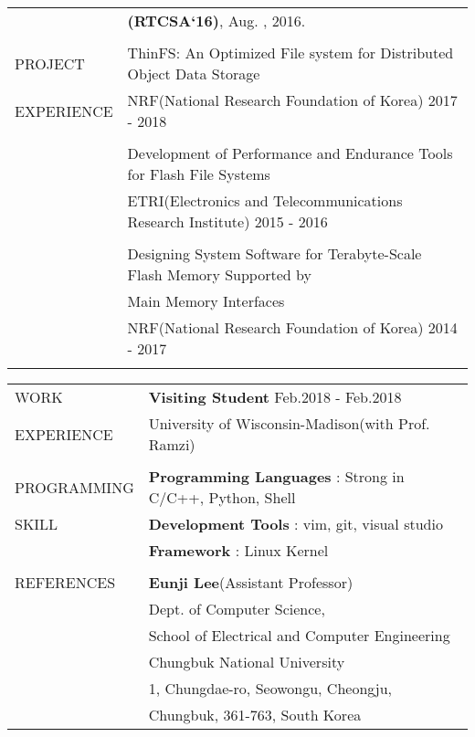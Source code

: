 \documentclass[letterpaper,11pt,oneside]{article}
\begin{document}
\begin{tabular}{@{} l l}
	&\textbf{(RTCSA`16)}, Aug. , 2016.\\
    & \\
  \Large{PROJECT}   & ThinFS: An Optimized File system for Distributed Object Data Storage \\
    \Large{EXPERIENCE}   & NRF(National Research Foundation of Korea) 2017 - 2018 \\
     & \\
     &Development of Performance and Endurance Tools for Flash File Systems\\
     &ETRI(Electronics and Telecommunications Research Institute) 2015 - 2016\\    
     &\\
     &Designing System Software for Terabyte-Scale Flash Memory Supported by \\
     &Main Memory Interfaces\\
     &NRF(National Research Foundation of Korea) 2014 - 2017\\
     & \\

\end{tabular}

\newpage


\noindent \begin{tabular}{@{} l l}
 \Large{WORK}    & \textbf{Visiting Student} \null\hfill Feb.2018 - Feb.2018\\
  \Large{EXPERIENCE}   & University of Wisconsin-Madison(with Prof. Ramzi) \\
     & \\

 \Large{PROGRAMMING}    & \textbf{Programming Languages} : Strong in C/C++, Python, Shell\\
  \Large{SKILL}   & \textbf{Development Tools} : vim, git, visual studio \\
  	& \textbf{Framework} : Linux Kernel\\
    & \\
 \Large{REFERENCES} & \textbf{Eunji Lee}(Assistant Professor)\\
	&Dept. of Computer Science,\\
	&School of Electrical and Computer Engineering\\
	&Chungbuk National University\\
	&1, Chungdae-ro, Seowongu, Cheongju,\\
	&Chungbuk, 361-763, South Korea
\end{tabular}



\clearpage
\setlength\parindent{0cm}
\end{document}
